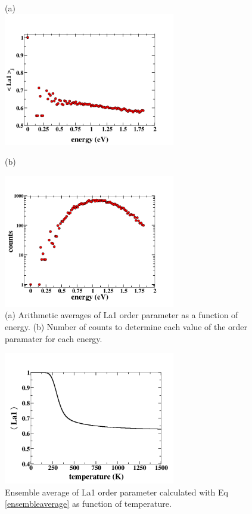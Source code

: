 \documentclass[aps,prl,reprint,superscriptaddress,showkeys]{revtex4-1}
\begin{document}
\begin{figure}
(a)\\
\includegraphics[width=7.5cm]{./figures/avg_OP.png}\\
\centerline{(b)}
\includegraphics[width=7.5cm]{./figures/OPcounts.png}
\caption{(a) Arithmetic averages of La1 order parameter as a function of energy. (b) Number of counts to determine each value of the order paramater for each energy. \label{arithemetic_avg}}
\end{figure}

\begin{figure}
\includegraphics[width=7.5cm]{./figures/OP_ensemble_avg.png}
\caption{Ensemble average of La1 order parameter calculated with Eq \ref{ensembleaverage} as function of temperature. \label{ensembleOP}}
\end{figure}
\end{document}
